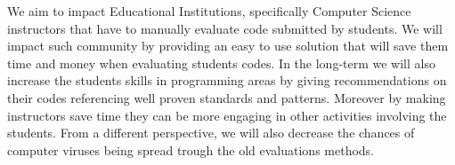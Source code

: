 We aim to impact Educational Institutions, specifically Computer Science instructors that have to manually evaluate code submitted by students. We will impact such community by providing an easy to use solution that will save them time and money when evaluating students codes. In the long-term we will also increase the students skills in programming areas by giving recommendations on their codes referencing well proven standards and patterns. Moreover by making instructors save time they can be more engaging in other activities involving the students. From a different perspective, we will also decrease the chances of computer viruses being spread trough the old evaluations methods.